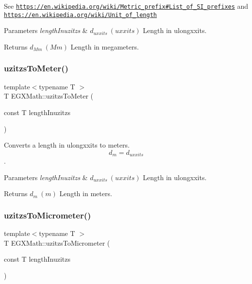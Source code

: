 See \href{https://en.wikipedia.org/wiki/Metric_prefix#List_of_SI_prefixes}{\tt https\+://en.\+wikipedia.\+org/wiki/\+Metric\+\_\+prefix\#\+List\+\_\+of\+\_\+\+S\+I\+\_\+prefixes} and \href{https://en.wikipedia.org/wiki/Unit_of_length}{\tt https\+://en.\+wikipedia.\+org/wiki/\+Unit\+\_\+of\+\_\+length} 
\begin{DoxyParams}{Parameters}
{\em length\+Inuzitzs} & $ d_{uxxits}\ (uxxits)$ Length in ulongxxits. \\
\hline
\end{DoxyParams}
\begin{DoxyReturn}{Returns}
$ d_{Mm}\ (Mm)$ Length in megameters. 
\end{DoxyReturn}
\mbox{\label{group___e_g_x_math-_conversions-_length_conversions-uzitzs-_s_i_gad256d80aa1424b503ded3fda023ee4dd}} 
\subsubsection{\texorpdfstring{uzitzs\+To\+Meter()}{uzitzsToMeter()}}
{\footnotesize\ttfamily template$<$typename T $>$ \\
T E\+G\+X\+Math\+::uzitzs\+To\+Meter (\begin{DoxyParamCaption}\item[{const T}]{length\+Inuzitzs }\end{DoxyParamCaption})}



Converts a length in ulongxxits to meters. \[ d_{m}=d_{uxxits} \]. 


\begin{DoxyParams}{Parameters}
{\em length\+Inuzitzs} & $ d_{uxxits}\ (uxxits)$ Length in ulongxxits. \\
\hline
\end{DoxyParams}
\begin{DoxyReturn}{Returns}
$ d_{m}\ (m)$ Length in meters. 
\end{DoxyReturn}
\mbox{\label{group___e_g_x_math-_conversions-_length_conversions-uzitzs-_s_i_ga0bd484a80b8b66cd5272bbbc1fe6b642}} 
\subsubsection{\texorpdfstring{uzitzs\+To\+Micrometer()}{uzitzsToMicrometer()}}
{\footnotesize\ttfamily template$<$typename T $>$ \\
T E\+G\+X\+Math\+::uzitzs\+To\+Micrometer (\begin{DoxyParamCaption}\item[{const T}]{length\+Inuzitzs }\end{DoxyParamCaption})}



